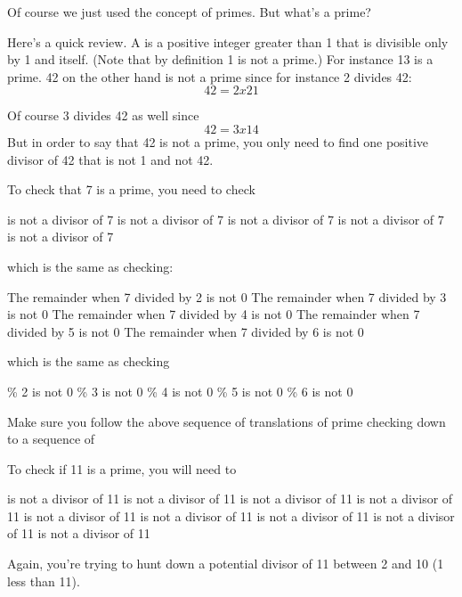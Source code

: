 
%
%

Of course we just used the concept of primes. But what's a prime?

Here's a quick review. A  is a positive integer greater than 1 that is divisible only by 1 and itself. (Note that by definition 1 is not a prime.) For instance 13 is a prime. 42 on the other hand is not a prime since for instance 2 divides 42:
\[42 = 2 x 21\]

Of course 3 divides 42 as well since
\[42 = 3 x 14\]
But in order to say that 42 is not a prime, you only need to find one
positive divisor of 42 that is not 1 and not 42.

To check that 7 is a prime, you need to check
\begin{tightlist}
 is not a divisor of 7
\li is not a divisor of 7
\li is not a divisor of 7
\li is not a divisor of 7
\li is not a divisor of 7
\end{tightlist}
which is the same as checking:
\begin{tightlist}
\li The remainder when 7 divided by 2 is not 0
\li The remainder when 7 divided by 3 is not 0
\li The remainder when 7 divided by 4 is not 0
\li The remainder when 7 divided by 5 is not 0
\li The remainder when 7 divided by 6 is not 0
\end{tightlist}
which is the same as checking
\begin{tightlist}
 \% 2 is not 0
 \% 3 is not 0
 \% 4 is not 0
 \% 5 is not 0
 \% 6 is not 0
\end{tightlist}
Make sure you follow the above sequence of translations of prime
checking down to a sequence of %

%
To check if 11 is a prime, you will need to
\begin{tightlist}
 is not a divisor of 11
 is not a divisor of 11
 is not a divisor of 11
 is not a divisor of 11
 is not a divisor of 11
 is not a divisor of 11
 is not a divisor of 11
 is not a divisor of 11
 is not a divisor of 11
\end{tightlist}
Again, you're trying to hunt down a potential divisor of 11 between 2 and
10 (1 less than 11).

